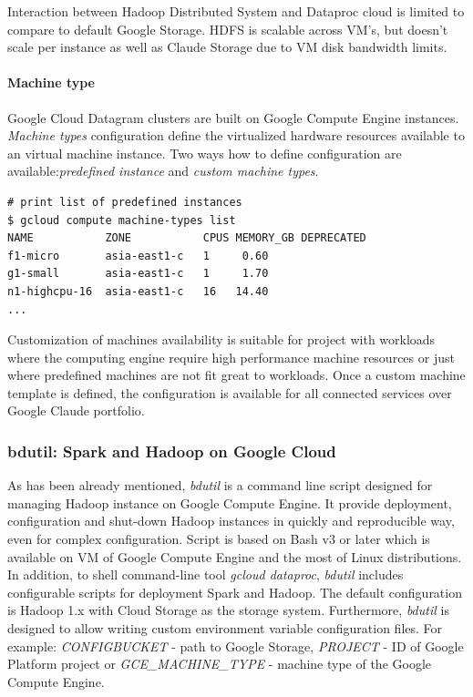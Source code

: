 \documentclass[a4paper,12pt,oneside]{report}
\begin{document}
	Interaction between Hadoop Distributed System and Dataproc cloud is limited to
	compare to default Google Storage. HDFS is scalable across VM’s, but doesn’t scale per instance as
	 well as Claude Storage due to VM disk bandwidth limits. 
	
	\paragraph{Machine type} Google Cloud Datagram clusters are built on Google
	Compute Engine instances. \textit{Machine types} configuration define the virtualized hardware
	 resources	available to an  virtual machine instance. Two ways how to define configuration are 
	 available:\textit{predefined instance} and \textit{custom machine types}.  
	
	\begin{footnotesize}
		\begin{lstlisting}[style=mybash]
# print list of predefined instances
$ gcloud compute machine-types list
NAME           ZONE           CPUS MEMORY_GB DEPRECATED
f1-micro       asia-east1-c   1     0.60
g1-small       asia-east1-c   1     1.70
n1-highcpu-16  asia-east1-c   16   14.40
...
		\end{lstlisting}
	\end{footnotesize}
	
	Customization of machines availability is suitable for project with workloads
	where the computing	engine require high performance machine resources or just where predefined
	machines are not fit great to workloads. Once a custom machine template is 
	defined, the configuration is available for all connected services over Google
	Claude portfolio.
	
	\subsubsection{bdutil: Spark and Hadoop on Google Cloud}\label{subsub:bdutil}
	As has been already mentioned, \textit{bdutil} is a command line script designed
	for	managing Hadoop instance on Google Compute Engine. It provide deployment,
	configuration	and shut-down Hadoop instances in quickly and reproducible way, even for complex
	configuration. 	Script is based on Bash v3 or later which is available on VM of Google Compute
	Engine  and the most of Linux distributions. In addition, to shell command-line tool
	\textit{gcloud dataproc}, \textit{bdutil} includes configurable scripts
	for deployment 	Spark and Hadoop. The default configuration is Hadoop 1.x with Cloud Storage as
	the storage system. Furthermore, \textit{bdutil} is designed to allow writing custom environment
	variable configuration 	files. For example: \emph{CONFIGBUCKET} - path to Google Storage, \emph{PROJECT}	
	- ID of Google Platform project or \emph{GCE\_MACHINE\_TYPE} - machine type of the Google Compute Engine.
	
\end{document}
